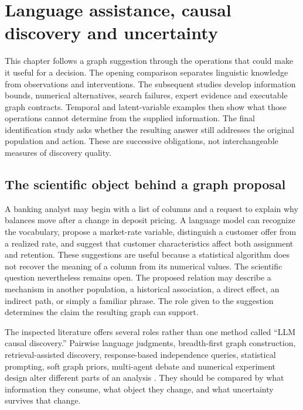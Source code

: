 \chapter{Language assistance, causal discovery and uncertainty}
\label{ch:la03-discovery}

This chapter follows a graph suggestion through the operations that could
make it useful for a decision. The opening comparison separates linguistic
knowledge from observations and interventions. The subsequent studies develop
information bounds, numerical alternatives, search failures, expert evidence
and executable graph contracts. Temporal and latent-variable examples then
show what those operations cannot determine from the supplied information.
The final identification study asks whether the resulting answer still
addresses the original population and action. These are successive obligations,
not interchangeable measures of discovery quality.

\section{The scientific object behind a graph proposal}

A banking analyst may begin with a list of columns and a request to explain why
balances move after a change in deposit pricing. A language model can recognize
the vocabulary, propose a market-rate variable, distinguish a customer offer
from a realized rate, and suggest that customer characteristics affect both
assignment and retention. These suggestions are useful because a statistical
algorithm does not recover the meaning of a column from its numerical values.
The scientific question nevertheless remains open. The proposed relation may
describe a mechanism in another population, a historical association, a direct
effect, an indirect path, or simply a familiar phrase. The role given to the
suggestion determines the claim the resulting graph can support.

The inspected literature offers several roles rather than one method called
``LLM causal discovery.'' Pairwise language judgments, breadth-first graph
construction, retrieval-assisted discovery, response-based independence
queries, statistical prompting, soft graph priors, multi-agent debate and
numerical experiment design alter different parts of an analysis
\cite{v12_la_2305_00050,v12_la_2402_01207,v12_la_2402_15301,
v12_la_2406_07378,v12_la_2402_01454,v12_la_2405_13551,
v12_la_2407_15073,v12_la_2608_09696}.
They should be compared by what information they consume, what object they
change, and what uncertainty survives that change.

